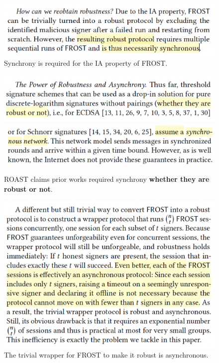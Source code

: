 \begin{figure}
    \centering
    \includegraphics[width=1\linewidth]{images/ROAST_IA.png}
    \caption{Synchrony is required for the IA property of FROST.}
\end{figure}

\begin{figure}
    \centering
    \includegraphics[width=1\linewidth]{images/ROAST_sync_reqd.png}
    \includegraphics[width=1\linewidth]{images/ROAST_sync_reqd2.png}
    \caption{ROAST claims prior works required synchrony \textbf{whether they are robust or not}.}
\end{figure}

\begin{figure}
    \centering
    \includegraphics[width=1\linewidth]{images/ROAST_wrapper.png}
    \caption{The trivial wrapper for FROST to make it robust is asynchronous.}
\end{figure}

